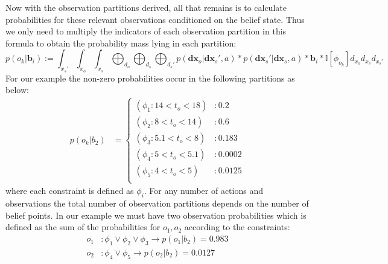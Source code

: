 \documentclass{article} %
\renewcommand{\vec}[1]{\mathbf{#1}} %
\newcommand{\xds}{\mathbf{dx}_s}
\newcommand{\xdo}{\mathbf{dx}_o}
\begin{document}
Now with the observation partitions derived, all that remains is to
calculate probabilities for these relevant observations conditioned on
the belief state. 
% 
Thus we only need to multiply the indicators of each observation partition 
in this formula to obtain the probability mass lying in each
partition:
$$p(o_k|\vec{b}_i) := \int_{x_s'}\int_{x_o}\int_{x_s} \bigoplus_{d_o} \bigoplus_{d_s} \bigoplus_{d_s'} p(\xdo|\xds',a)*p(\xds'|\xds,a)*\vec{b}_i* \mathbb{I}[\phi_{o_k}] d_{x_o} d_{x_s}d_{x_s'}$$
For our example the non-zero probabilities occur in the following partitions as below:
{\footnotesize
\vspace{-2mm}
\begin{align}
p(o_k|b_2) &= 
\begin{cases}
(\phi_1 : 14 < t_o< 18) & : 0.2\\
(\phi_2 : 8 < t_o< 14) & :  0.6\\
(\phi_3 : 5.1 < t_o< 8) & : 0.183\\
(\phi_4 : 5 < t_o< 5.1) & : 0.0002\\
(\phi_5 : 4 < t_o< 5) & :  0.0125\\
\end{cases}
\nonumber
\end{align}
}
where each constraint is defined as $\phi_i$. For any number of actions and observations the total number of observation partitions depends on the number of belief points. In our example we must have two observation probabilities which is defined as the sum of the probabilities for $o_1,o_2$ according to the constraints: 
\begin{align*}
o_1&: \phi_1 \vee \phi_2 \vee \phi_3 \longrightarrow p(o_1|b_2)=0.983 \\
o_2&: \phi_4 \vee \phi_5  \longrightarrow p(o_2|b_2)=0.0127
\end{align*}
\end{document}
